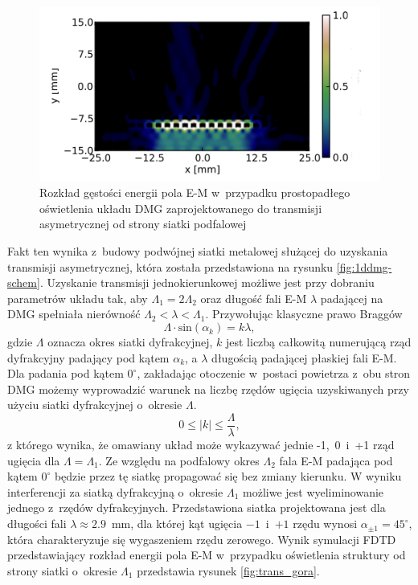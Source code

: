 \begin{figure}[tb]
	\includegraphics[width=\textwidth]{images/thz/opt_letters_dol.png}
	\caption{Rozkład gęstości energii pola E-M w~przypadku prostopadłego oświetlenia układu DMG zaprojektowanego do transmisji asymetrycznej od strony siatki podfalowej~\cite{Stolarek:13} }
	\label{fig:trans_dol}
\end{figure}

Fakt ten wynika z~budowy podwójnej siatki metalowej służącej do uzyskania transmisji asymetrycznej, która została przedstawiona na rysunku \ref{fig:1ddmg-schem}. Uzyskanie transmisji jednokierunkowej możliwe jest przy dobraniu parametrów układu tak, aby $\Lambda_1 = 2\Lambda_2$ oraz długość fali E-M $\lambda$ padającej na DMG  spełniała nierówność $\Lambda_2<\lambda<\Lambda_1$. Przywołując klasyczne prawo Braggów
\begin{equation}
	\Lambda \cdot \textrm{sin}(\alpha_k) = k \lambda,
\end{equation}
gdzie $\Lambda$ oznacza okres siatki dyfrakcyjnej, $k$ jest liczbą całkowitą numerującą rząd dyfrakcyjny padający pod kątem $\alpha_k$, a $\lambda$ długością padającej płaskiej fali E-M. Dla padania pod kątem $0^{\circ}$, zakładając otoczenie w~postaci powietrza z~obu stron DMG możemy wyprowadzić warunek na liczbę rzędów ugięcia uzyskiwanych przy użyciu siatki dyfrakcyjnej o~okresie $\Lambda$. 
\begin{equation}
	 0 \le |k| \le \frac { \Lambda }{\lambda},
\end{equation}
z którego wynika, że omawiany układ może wykazywać jednie -1,~0~i~+1 rząd ugięcia dla  $\Lambda=\Lambda_1$. Ze względu na podfalowy okres $\Lambda_2$ fala E-M padająca pod kątem $0^{\circ}$ będzie przez tę siatkę propagować się bez zmiany kierunku.  W wyniku interferencji za siatką dyfrakcyjną o~okresie $\Lambda_1$ możliwe jest wyeliminowanie jednego z~rzędów dyfrakcyjnych. Przedstawiona siatka projektowana jest dla długości fali $\lambda \approx 2.9$~mm, dla której kąt ugięcia $-1$~i~$+1$ rzędu wynosi $\alpha_{\pm 1} = 45^{\circ}$, która charakteryzuje się wygaszeniem rzędu zerowego. Wynik symulacji FDTD przedstawiający rozkład energii pola E-M w~przypadku oświetlenia struktury od strony siatki o~okresie $\Lambda_1$ przedstawia rysunek \ref{fig:trans_gora}.


